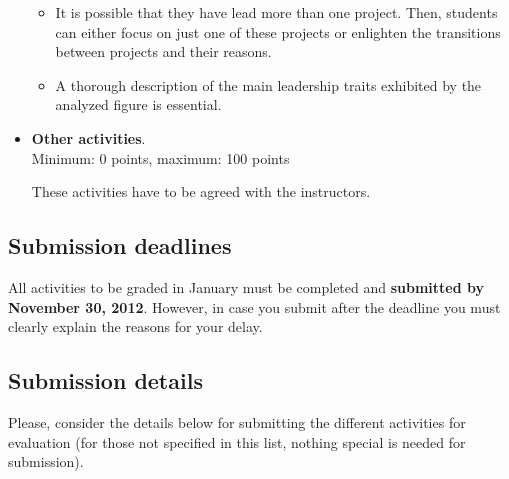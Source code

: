 \documentclass[a4paper]{article}
\begin{document}
\begin{itemize}
\begin{itemize}
   \item It is possible that they have lead more than one project. Then, students can either focus on just
   one of these projects or enlighten the transitions between projects and their reasons.
   \item A thorough description of the main leadership traits exhibited by the analyzed figure is essential.
  \end{itemize}


\item \textbf{Other activities}. \\
  Minimum: 0 points, maximum: 100 points

  These activities have to be agreed with the instructors.
\end{itemize}

\subsection{Submission deadlines}

All activities to be graded in January must be completed and \textbf{submitted by November 30, 2012}. However,
in case you submit after the deadline you must clearly explain the reasons for your delay.

\subsection{Submission details}

Please, consider the details below for submitting the different activities for evaluation (for those not specified in this list, nothing special is needed for submission).
\end{document}
